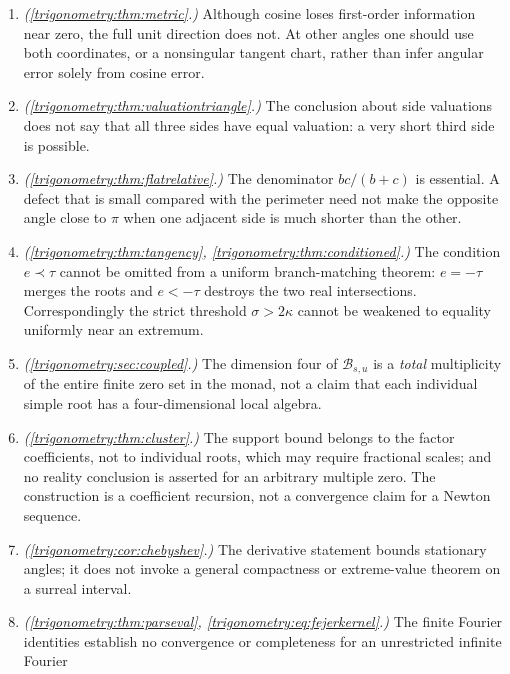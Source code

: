 \documentclass[11pt,letterpaper]{article}
\numberwithin{equation}{section}
\theoremstyle{definition}
\theoremstyle{remark}
\begin{document}
\begin{enumerate}
 representatives around the circle; it is not defined by fine-continuous motion of a real
 parameter. More generally, algebraic identities among finitely many vectors often survive
 unchanged, while any analytic interpretation of the associated angles must still be supplied.
\item \emph{(\cref{trigonometry:thm:metric}.)} Although cosine loses first-order information near
 zero, the full unit direction does not. At other angles one should use both coordinates, or a
 nonsingular tangent chart, rather than infer angular error solely from cosine error.
\item \emph{(\cref{trigonometry:thm:valuationtriangle}.)} The conclusion about side valuations does
 not say that all three sides have equal valuation: a very short third side is possible.
\item \emph{(\cref{trigonometry:thm:flatrelative}.)} The denominator $bc/(b+c)$ is essential. A
 defect that is small compared with the perimeter need not make the opposite angle close to $\pi$
 when one adjacent side is much shorter than the other.
\item \emph{(\cref{trigonometry:thm:tangency}, \cref{trigonometry:thm:conditioned}.)} The condition
 $e\prec\tau$ cannot be omitted from a uniform branch-matching theorem: $e=-\tau$ merges the roots
 and $e<-\tau$ destroys the two real intersections. Correspondingly the strict threshold
 $\sigma>2\kappa$ cannot be weakened to equality uniformly near an extremum.
\item \emph{(\cref{trigonometry:sec:coupled}.)} The dimension four of $\mathcal B_{s,u}$ is a
 \emph{total} multiplicity of the entire finite zero set in the monad, not a claim that each
 individual simple root has a four-dimensional local algebra.
\item \emph{(\cref{trigonometry:thm:cluster}.)} The support bound belongs to the factor
 coefficients, not to individual roots, which may require fractional scales; and no reality
 conclusion is asserted for an arbitrary multiple zero. The construction is a coefficient
 recursion, not a convergence claim for a Newton sequence.
\item \emph{(\cref{trigonometry:cor:chebyshev}.)} The derivative statement bounds stationary
 angles; it does not invoke a general compactness or extreme-value theorem on a surreal interval.
\item \emph{(\cref{trigonometry:thm:parseval}, \cref{trigonometry:eq:fejerkernel}.)} The finite
 Fourier identities establish no convergence or completeness for an unrestricted infinite Fourier

\end{enumerate}
\end{document}
